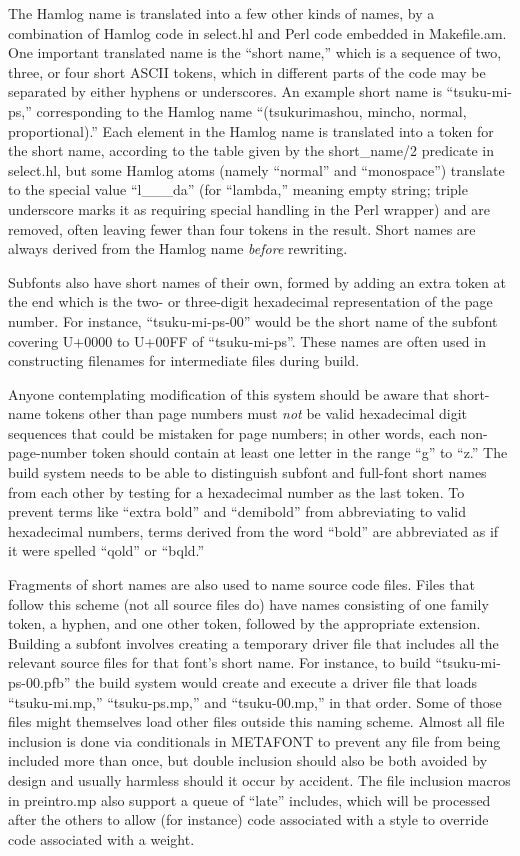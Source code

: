 \documentclass[14pt]{extarticle}
\begin{document}
The Hamlog name is translated into a few other kinds of names, by a
combination of Hamlog code in select.hl and Perl code embedded in
Makefile.am.  One important translated name is the ``short name,'' which is
a sequence of two, three, or four short ASCII tokens, which in different
parts of the code may be separated by either hyphens or underscores.  An
example short name is ``tsuku-mi-ps,'' corresponding to the Hamlog name
``(tsukurimashou, mincho, normal, proportional).'' Each element in the
Hamlog name is translated into a token for the short name, according to the
table given by the short\_name/2 predicate in select.hl, but some Hamlog
atoms (namely ``normal'' and ``monospace'') translate to the special value
``l\_\_\_da'' (for ``lambda,'' meaning empty string; triple underscore marks
it as requiring special handling in the Perl wrapper) and are removed,
often leaving fewer than four tokens in the result.  Short names are always
derived from the Hamlog name \emph{before} rewriting.

Subfonts also have short names of their own, formed by adding an extra token
at the end which is the two- or three-digit hexadecimal representation of
the page number.  For instance, ``tsuku-mi-ps-00'' would be the short name
of the subfont covering U+0000 to U+00FF of ``tsuku-mi-ps''.  These names
are often used in constructing filenames for intermediate files during
build.

Anyone contemplating modification of this system should be aware that
short-name tokens other than page numbers must \emph{not} be valid
hexadecimal digit sequences that could be mistaken for page numbers; in
other words, each non-page-number token should contain at least one letter
in the range ``g'' to ``z.'' The build system needs to be able to
distinguish subfont and full-font short names from each other by testing for
a hexadecimal number as the last token.  To prevent terms like ``extra
bold'' and ``demibold'' from abbreviating to valid hexadecimal numbers,
terms derived from the word ``bold'' are abbreviated as if it were spelled
``qold'' or ``bqld.''

Fragments of short names are also used to name source code files.  Files
that follow this scheme (not all source files do) have names consisting of
one family token, a hyphen, and one other token, followed by the appropriate
extension.  Building a subfont involves creating a temporary driver file
that includes all the relevant source files for that font's short name.  For
instance, to build ``tsuku-mi-ps-00.pfb'' the build system would create and
execute a driver file that loads ``tsuku-mi.mp,'' ``tsuku-ps.mp,'' and
``tsuku-00.mp,'' in that order.  Some of those files might themselves load
other files outside this naming scheme.  Almost all file inclusion is done
via conditionals in METAFONT to prevent any file from being included more
than once, but double inclusion should also be both avoided by design and
usually harmless should it occur by accident.  The file inclusion macros in
preintro.mp also support a queue of ``late'' includes, which will be
processed after the others to allow (for instance) code associated with a
style to override code associated with a weight.
\end{document}
